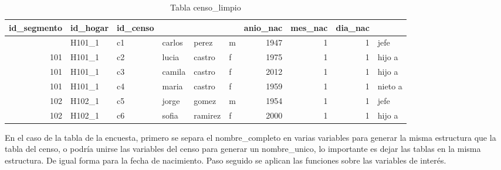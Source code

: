 \documentclass[
  12pt,
]{book}
\begin{document}
\begin{table}[t]
\caption*{
{\large Tabla censo\_limpio}
} 
\fontsize{12.0pt}{14.4pt}\selectfont
\begin{tabular*}{\linewidth}{@{\extracolsep{\fill}}rlllllrrrl}
\toprule
id\_segmento & id\_hogar & id\_censo & {\bfseries \cellcolor[HTML]{F9F9F9}{nombre}} & {\bfseries \cellcolor[HTML]{F9F9F9}{apellido}} & {\bfseries \cellcolor[HTML]{F9F9F9}{sexo}} & anio\_nac & mes\_nac & dia\_nac & {\bfseries \cellcolor[HTML]{F9F9F9}{parentesco}} \\ 
\midrule\addlinespace[2.5pt]
101 & H101\_1 & c1 & carlos & perez & m & 1947 & 1 & 1 & jefe \\ 
101 & H101\_1 & c2 & lucia & castro & f & 1975 & 1 & 1 & hijo a \\ 
101 & H101\_1 & c3 & camila & castro & f & 2012 & 1 & 1 & hijo a \\ 
101 & H101\_1 & c4 & maria & castro & f & 1959 & 1 & 1 & nieto a \\ 
102 & H102\_1 & c5 & jorge & gomez & m & 1954 & 1 & 1 & jefe \\ 
102 & H102\_1 & c6 & sofia & ramirez & f & 2000 & 1 & 1 & hijo a \\ 
\bottomrule
\end{tabular*}
\end{table}

En el caso de la tabla de la encuesta, primero se separa el nombre\_completo en varias variables para generar la misma estructura que la tabla del censo, o podría unirse las variables del censo para generar un nombre\_unico, lo importante es dejar las tablas en la misma estructura. De igual forma para la fecha de nacimiento. Paso seguido se aplican las funciones sobre las variables de interés.
\end{document}
